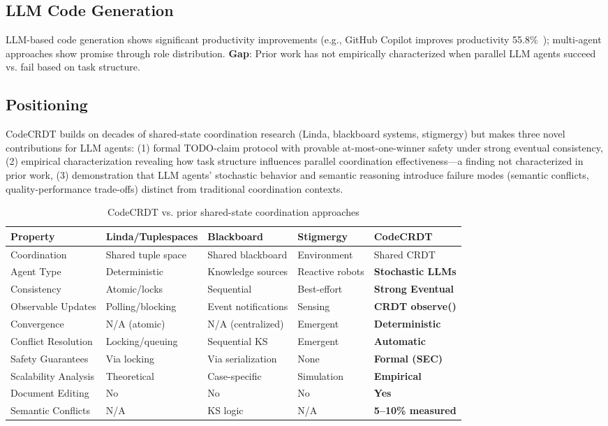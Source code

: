 \documentclass{article}
\begin{document}
\subsection{LLM Code Generation}

LLM-based code generation shows significant productivity improvements (e.g., GitHub Copilot improves productivity 55.8\%~\cite{peng2023copilot}); multi-agent approaches show promise through role distribution. \textbf{Gap}: Prior work has not empirically characterized when parallel LLM agents succeed vs. fail based on task structure.

\subsection{Positioning}

CodeCRDT builds on decades of shared-state coordination research (Linda, blackboard systems, stigmergy) but makes three novel contributions for LLM agents: (1) formal TODO-claim protocol with provable at-most-one-winner safety under strong eventual consistency, (2) empirical characterization revealing how task structure influences parallel coordination effectiveness---a finding not characterized in prior work, (3) demonstration that LLM agents' stochastic behavior and semantic reasoning introduce failure modes (semantic conflicts, quality-performance trade-offs) distinct from traditional coordination contexts.

\begin{table}[t]
\caption{CodeCRDT vs. prior shared-state coordination approaches}
\label{tab:comparison}
\vskip 0.15in
\centering
\small
\begin{tabular}{lllll}
\toprule
\textbf{Property} & \textbf{Linda/Tuplespaces} & \textbf{Blackboard} & \textbf{Stigmergy} & \textbf{CodeCRDT} \\
\midrule
Coordination & Shared tuple space & Shared blackboard & Environment & Shared CRDT \\
Agent Type & Deterministic & Knowledge sources & Reactive robots & \textbf{Stochastic LLMs} \\
Consistency & Atomic/locks & Sequential & Best-effort & \textbf{Strong Eventual} \\
Observable Updates & Polling/blocking & Event notifications & Sensing & \textbf{CRDT observe()} \\
Convergence & N/A (atomic) & N/A (centralized) & Emergent & \textbf{Deterministic} \\
Conflict Resolution & Locking/queuing & Sequential KS & Emergent & \textbf{Automatic} \\
Safety Guarantees & Via locking & Via serialization & None & \textbf{Formal (SEC)} \\
Scalability Analysis & Theoretical & Case-specific & Simulation & \textbf{Empirical} \\
Document Editing & No & No & No & \textbf{Yes} \\
Semantic Conflicts & N/A & KS logic & N/A & \textbf{5--10\% measured} \\
\bottomrule
\end{tabular}
\end{table}
\end{document}
